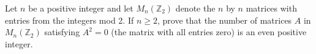 Let $n$ be a positive integer and let $M_n (\mathbb{Z}_2)$ denote the $n$ by
$n$ matrices with entries from the integers mod 2. If $n \ge 2$, prove that the
number of matrices $A$ in $M_n (\mathbb{Z}_2)$ satisfying $A^2 = 0$ (the matrix
with all entries zero) is an even positive integer.
